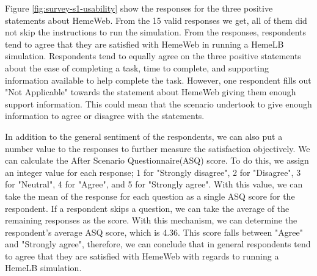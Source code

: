 \vspace{0.5cm}

\noindent%
\begin{minipage}{\linewidth}%
 \label{fig:survey-s1-usability}%
\end{minipage}
\vspace{0.5cm}


Figure \ref{fig:survey-s1-usability} show the responses for the three positive statements about HemeWeb. From the 15 valid responses we get, all of them did not skip the instructions to run the simulation. From the responses, respondents tend to agree that they are satisfied with HemeWeb in running a HemeLB simulation. Respondents tend to equally agree on the three positive statements about the ease of completing a task, time to complete, and supporting information available to help complete the task. However, one respondent fills out "Not Applicable" towards the statement about HemeWeb giving them enough support information. This could mean that the scenario undertook to give enough information to agree or disagree with the statements.

In addition to the general sentiment of the respondents, we can also put a number value to the responses to further measure the satisfaction objectively. We can calculate the After Scenario Questionnaire(ASQ) score. To do this, we assign an integer value for each response; 1 for "Strongly disagree", 2 for "Disagree", 3 for "Neutral", 4 for "Agree", and 5 for "Strongly agree". With this value, we can take the mean of the response for each question as a single ASQ score for the respondent. If a respondent skips a question, we can take the average of the remaining responses as the score. With this mechanism, we can determine the respondent's average ASQ score, which is 4.36. This score falls between "Agree" and "Strongly agree", therefore, we can conclude that in general respondents tend to agree that they are satisfied with HemeWeb with regards to running a HemeLB simulation.



